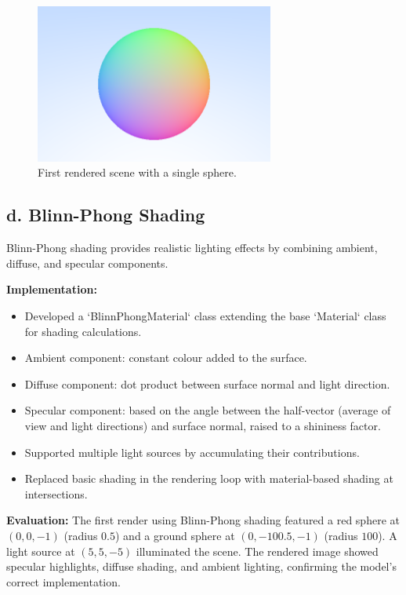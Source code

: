 \documentclass[11pt,a4paper]{article}
\begin{document}
\begin{figure}[H]  
\centering  
\includegraphics[width=0.7\textwidth]{first_image.png}  
\caption{First rendered scene with a single sphere.}  
\label{fig:first-rendered-scene}  
\end{figure}  

\subsection{d. Blinn-Phong Shading}  
\label{sec:blinn-phong-shading}

Blinn-Phong shading provides realistic lighting effects by combining ambient, diffuse, and specular components.

\noindent\textbf{Implementation:}  
\begin{itemize}
    \item Developed a `BlinnPhongMaterial` class extending the base `Material` class for shading calculations.  
    \item Ambient component: constant colour added to the surface.  
    \item Diffuse component: dot product between surface normal and light direction.  
    \item Specular component: based on the angle between the half-vector (average of view and light directions) and surface normal, raised to a shininess factor.  
    \item Supported multiple light sources by accumulating their contributions.  
    \item Replaced basic shading in the rendering loop with material-based shading at intersections.  
\end{itemize}

\noindent\textbf{Evaluation:}  
The first render using Blinn-Phong shading featured a red sphere at \((0, 0, -1)\) (radius \(0.5\)) and a ground sphere at \((0, -100.5, -1)\) (radius \(100\)). A light source at \((5, 5, -5)\) illuminated the scene. The rendered image showed specular highlights, diffuse shading, and ambient lighting, confirming the model's correct implementation.  
\end{document}
